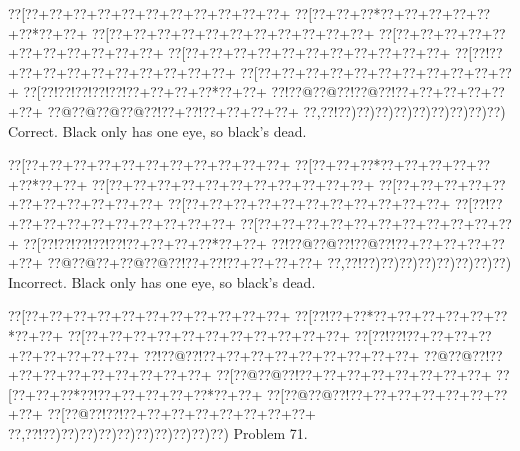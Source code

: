\documentclass[a5paper]{article}
\begin{document}
\begin{center}
{\goo
\0??[\0??+\0??+\0??+\0??+\0??+\0??+\0??+\0??+\0??+\0??+\0??+
\0??[\0??+\0??+\0??*\0??+\0??+\0??+\0??+\0??+\0??*\0??+\0??+
\0??[\0??+\0??+\0??+\0??+\0??+\0??+\0??+\0??+\0??+\0??+\0??+
\0??[\0??+\0??+\0??+\0??+\0??+\0??+\0??+\0??+\0??+\0??+\0??+
\0??[\0??+\0??+\0??+\0??+\0??+\0??+\0??+\0??+\0??+\0??+\0??+
\0??[\0??!\0??+\0??+\0??+\0??+\0??+\0??+\0??+\0??+\0??+\0??+
\0??[\0??+\0??+\0??+\0??+\0??+\0??+\0??+\0??+\0??+\0??+\0??+
\0??[\0??!\0??!\0??!\0??!\0??!\0??+\0??+\0??+\0??*\0??+\0??+
\0??!\0??@\0??@\0??!\0??@\0??!\0??+\0??+\0??+\0??+\0??+\0??+
\0??@\0??@\0??@\0??@\0??!\0??+\0??!\0??+\0??+\0??+\0??+
\0??,\0??!\0??)\0??)\0??)\0??)\0??)\0??)\0??)\0??)\0??)
}
Correct. Black only has one eye, so black's dead.

\end{center}
\begin{center}
{\goo
\0??[\0??+\0??+\0??+\0??+\0??+\0??+\0??+\0??+\0??+\0??+\0??+
\0??[\0??+\0??+\0??*\0??+\0??+\0??+\0??+\0??+\0??*\0??+\0??+
\0??[\0??+\0??+\0??+\0??+\0??+\0??+\0??+\0??+\0??+\0??+\0??+
\0??[\0??+\0??+\0??+\0??+\0??+\0??+\0??+\0??+\0??+\0??+\0??+
\0??[\0??+\0??+\0??+\0??+\0??+\0??+\0??+\0??+\0??+\0??+\0??+
\0??[\0??!\0??+\0??+\0??+\0??+\0??+\0??+\0??+\0??+\0??+\0??+
\0??[\0??+\0??+\0??+\0??+\0??+\0??+\0??+\0??+\0??+\0??+\0??+
\0??[\0??!\0??!\0??!\0??!\0??!\0??+\0??+\0??+\0??*\0??+\0??+
\0??!\0??@\0??@\0??!\0??@\0??!\0??+\0??+\0??+\0??+\0??+\0??+
\0??@\0??@\0??+\0??@\0??@\0??!\0??+\0??!\0??+\0??+\0??+\0??+
\0??,\0??!\0??)\0??)\0??)\0??)\0??)\0??)\0??)\0??)
}
Incorrect. Black only has one eye, so black's dead.

\end{center}
\newpage
\begin{center}
{\goo
\0??[\0??+\0??+\0??+\0??+\0??+\0??+\0??+\0??+\0??+\0??+\0??+
\0??[\0??!\0??+\0??*\0??+\0??+\0??+\0??+\0??+\0??*\0??+\0??+
\0??[\0??+\0??+\0??+\0??+\0??+\0??+\0??+\0??+\0??+\0??+\0??+
\0??[\0??!\0??!\0??+\0??+\0??+\0??+\0??+\0??+\0??+\0??+\0??+
\0??!\0??@\0??!\0??+\0??+\0??+\0??+\0??+\0??+\0??+\0??+\0??+
\0??@\0??@\0??!\0??+\0??+\0??+\0??+\0??+\0??+\0??+\0??+\0??+
\0??[\0??@\0??@\0??!\0??+\0??+\0??+\0??+\0??+\0??+\0??+\0??+
\0??[\0??+\0??+\0??*\0??!\0??+\0??+\0??+\0??+\0??*\0??+\0??+
\0??[\0??@\0??@\0??!\0??+\0??+\0??+\0??+\0??+\0??+\0??+\0??+
\0??[\0??@\0??!\0??!\0??+\0??+\0??+\0??+\0??+\0??+\0??+\0??+
\0??,\0??!\0??)\0??)\0??)\0??)\0??)\0??)\0??)\0??)\0??)\0??)
}
Problem 71.

\end{center}
\end{document}
